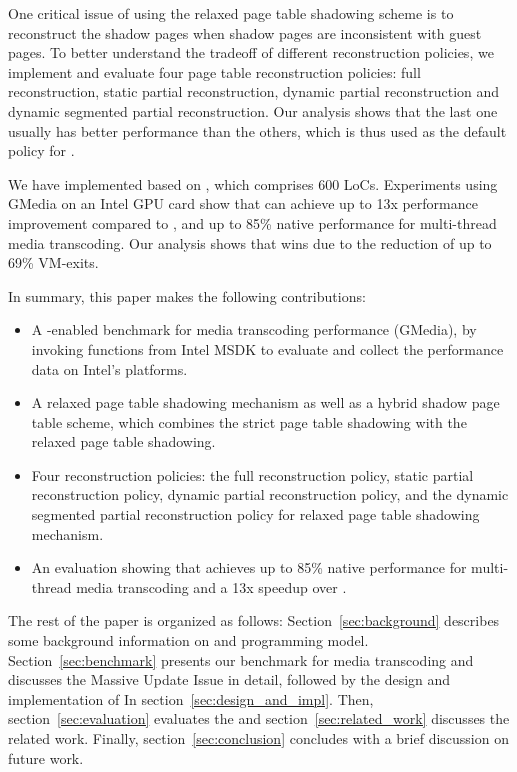 One critical issue of using the relaxed page table shadowing scheme is to reconstruct the
shadow pages when shadow pages are inconsistent with guest pages. 
To better understand the tradeoff of different reconstruction policies, 
we implement and evaluate four page table reconstruction policies: full reconstruction, static partial reconstruction, dynamic partial reconstruction and dynamic segmented partial reconstruction. Our analysis shows that the last one usually has better performance than the others, 
which is thus used as the default policy for \name{}. 

We have implemented \name{} based on \gvirt{}, which comprises 600 LoCs. 
Experiments using GMedia on an Intel GPU card show that \name{} can achieve 
up to 13x performance improvement compared to \gvirt{}, and up to 85\% native 
performance for multi-thread media transcoding. 
Our analysis shows that \name{} wins due to the reduction of up to 69\% 
VM-exits. 

In summary, this paper makes the following contributions:

\begin{itemize}

\item A \gpu{}-enabled benchmark for media transcoding performance (GMedia), by invoking functions 
from Intel MSDK to evaluate and collect the  performance data on Intel's \gpu{} platforms. 

  \item A relaxed page table shadowing mechanism as well as a hybrid shadow page table scheme, 
  which combines the strict page table shadowing with the relaxed page table shadowing.

  \item Four reconstruction policies: the full reconstruction policy, static partial reconstruction policy, dynamic partial reconstruction policy, and the dynamic segmented partial reconstruction policy for relaxed page table shadowing mechanism.
  
 \item An evaluation showing that \name{} achieves up to 85\% native performance for multi-thread media transcoding and a 13x speedup over \gvirt{}.

\end{itemize}

The rest of the paper is organized as follows: Section~\ref{sec:background} describes some background information 
on \gvirt{} and \gpu{} programming model. Section~\ref{sec:benchmark} presents our benchmark for media transcoding 
and discusses the Massive Update Issue in detail, followed by the design and implementation of \name{} 
 In section~\ref{sec:design_and_impl}. Then, section~\ref{sec:evaluation} evaluates the \name{} and
 section~\ref{sec:related_work} discusses the related work. Finally, section~\ref{sec:conclusion} concludes with
 a brief discussion on future work. 
